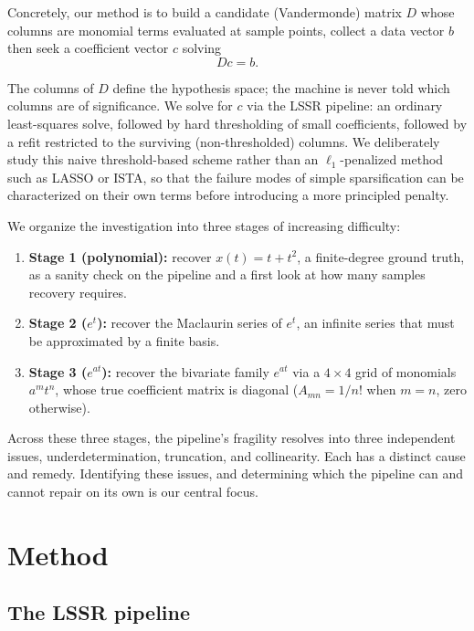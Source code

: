 \documentclass[11pt]{article}
\begin{document}
Concretely, our method is to build a candidate (Vandermonde) matrix $D$ whose columns are monomial terms evaluated at sample points, collect a data vector $b$ then seek a coefficient vector $c$ solving
\begin{equation}
D c = b.
\label{eq:dcb}
\end{equation}

The columns of $D$ define the hypothesis space; the machine is never told which columns
are of significance. We solve for $c$ via the LSSR pipeline: an ordinary least-squares solve, followed by hard thresholding of small coefficients, followed by a refit restricted to the surviving (non-thresholded) columns. We deliberately study this naive threshold-based scheme rather than an $\ell_1$-penalized method such as LASSO\cite{tibshirani1996lasso} or ISTA\cite{beck2009fista}, so that the failure modes of simple sparsification can be characterized on their own terms before introducing a more principled penalty.

We organize the investigation into three stages of increasing difficulty:

\begin{enumerate}
  \item \textbf{Stage 1 (polynomial):} recover $x(t) = t + t^2$, a finite-degree
  ground truth, as a sanity check on the pipeline and a first look at how many samples recovery requires.
  \item \textbf{Stage 2 ($e^{t}$):} recover the Maclaurin series of $e^{t}$, an
  infinite series that must be approximated by a finite basis.
  \item \textbf{Stage 3 ($e^{at}$):} recover the bivariate family $e^{at}$ via a
  $4\times 4$ grid of monomials $a^m t^n$, whose true coefficient matrix is diagonal
  ($A_{mn} = 1/n!$ when $m=n$, zero otherwise).
\end{enumerate}

Across these three stages, the pipeline's fragility resolves into three independent issues, underdetermination, truncation, and collinearity. Each has a distinct cause and remedy. Identifying these issues, and determining which the pipeline can and cannot repair on its own is our central focus.

\section{Method}

\subsection{The LSSR pipeline}
\end{document}
